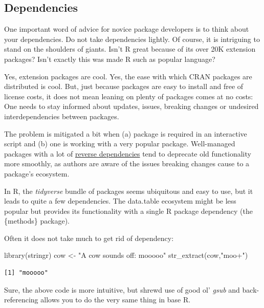 \documentclass[
  12pt,
  letterpaper,
]{krantz}
\newenvironment{Shaded}{\begin{snugshade}}{\end{snugshade}}
\newcommand{\FunctionTok}[1]{\textcolor[rgb]{0.28,0.35,0.67}{#1}}
\newcommand{\NormalTok}[1]{\textcolor[rgb]{0.00,0.23,0.31}{#1}}
\newcommand{\OtherTok}[1]{\textcolor[rgb]{0.00,0.23,0.31}{#1}}
\newcommand{\StringTok}[1]{\textcolor[rgb]{0.13,0.47,0.30}{#1}}
\begin{document}
\hypertarget{dependencies}{%
\subsection{Dependencies}\label{dependencies}}

One important word of advice for novice package developers is to think
about your dependencies. Do not take dependencies lightly. Of course, it
is intriguing to stand on the shoulders of giants. Isn't R great because
of its over 20K extension packages? Isn't exactly this was made R such
as popular language?

Yes, extension packages are cool. Yes, the ease with which CRAN packages
are distributed is cool. But, just because packages are easy to install
and free of license costs, it does not mean leaning on plenty of
packages comes at no costs: One needs to stay informed about updates,
issues, breaking changes or undesired interdependencies between
packages.

The problem is mitigated a bit when (a) package is required in an
interactive script and (b) one is working with a very popular package.
Well-managed packages with a lot of
\protect\hyperlink{glossary--}{reverse dependencies} tend to deprecate
old functionality more smoothly, as authors are aware of the issues
breaking changes cause to a package's ecosystem.

In R, the \emph{tidyverse} bundle of packages seems ubiquitous and easy
to use, but it leads to quite a few dependencies. The data.table
ecosystem might be less popular but provides its functionality with a
single R package dependency (the \{methods\} package).

Often it does not take much to get rid of dependency:

\begin{Shaded}
\begin{Highlighting}[]
\FunctionTok{library}\NormalTok{(stringr)}
\NormalTok{cow }\OtherTok{\textless{}{-}} \StringTok{"A cow sounds off: mooooo"}
\FunctionTok{str\_extract}\NormalTok{(cow,}\StringTok{"moo+"}\NormalTok{)}
\end{Highlighting}
\end{Shaded}

\begin{verbatim}
[1] "mooooo"
\end{verbatim}

Sure, the above code is more intuitive, but shrewd use of good ol'
\emph{gsub} and back-referencing allows you to do the very same thing in
base R.
\end{document}
